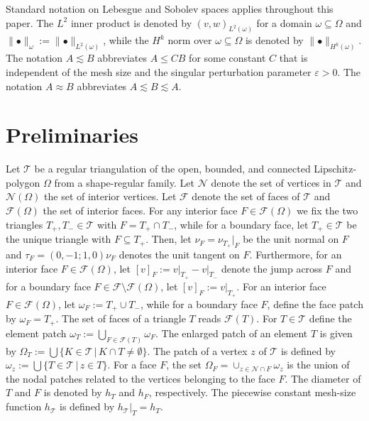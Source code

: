 \documentclass[a4paper]{amsart}
\theoremstyle{definition}
\numberwithin{equation}{section}
\numberwithin{theorem}{section}
\newcommand{\tri}{\mathcal{T}}
\begin{document}
\medskip
Standard notation on Lebesgue and Sobolev spaces
applies throughout this paper. The $L^2$ inner product is denoted
by
$(v,w)_{L^2(\omega)}$ for a domain $\omega\subseteq \Omega$
and $\lVert\bullet\rVert_\omega:=\lVert\bullet\rVert_{L^2(\omega)}$,
while the $H^k$ norm over $\omega\subseteq \Omega$
is denoted by
$\lVert\bullet\rVert_{H^k(\omega)}$.
The notation $A\lesssim B$ abbreviates $A\leq C B$ for some
constant $C$ that is independent of the mesh size and
the singular perturbation parameter $\varepsilon>0$.
The notation $A\approx B$ abbreviates $A\lesssim B\lesssim A$.




\section{Preliminaries}\label{s:prelim}

Let $\tri$ be a regular triangulation of the open, bounded, and connected
Lipschitz-polygon $\Omega$ from a shape-regular
family. 
Let $\mathcal{N}$ denote the set of vertices in $\tri$ and 
$\mathcal{N}(\Omega)$ the set of interior vertices.
Let $\mathcal{F}$ denote the set of faces of $\tri$ and
$\mathcal{F}(\Omega)$ the set of interior faces.
For any interior face $F\in\mathcal{F}(\Omega)$ we fix
the two triangles $T_+,T_-\in\tri$ with $F=T_+\cap T_-$,
while for a boundary face, let $T_+\in\tri$ be the unique
triangle with $F\subseteq T_+$.
Then, let $\nu_F=\nu_{T_+}\vert_F$ be the unit normal
on $F$ and $\tau_F = (0, -1; 1, 0) \nu_F$ denotes the unit tangent on $F$.
Furthermore, for an interior face $F\in\mathcal{F}(\Omega)$,
let $[v]_F:=v\vert_{T_+}-v\vert_{T_-}$ denote the jump across $F$
and for a boundary face $F\in\mathcal{F}\setminus\mathcal{F}(\Omega)$,
let $[v]_F:=v\vert_{T_+}$.
For an interior face $F\in\mathcal{F}(\Omega)$,
let $\omega_F:=T_+\cup T_-$, while for a boundary face $F$,
define the face patch by $\omega_F=T_+$.
The set of faces of a triangle $T$ reads $\mathcal F(T)$.
For $T\in\tri$ define the element patch 
$\omega_T:=\bigcup_{F\in\mathcal F(T)}\omega_F$.
The enlarged patch of an element $T$ is given by 
$\Omega_T:=\bigcup \{K\in\tri\,\vert\, K\cap T\neq \emptyset\}$.
The patch of a vertex $z$ of $\tri$ is defined by 
$\omega_z:=\bigcup \{T\in\tri\,\vert\, z\in T\}$.
For a face $F$, the set
$\Omega_F = \cup_{z\in \mathcal N \cap F} \omega_{z}$
is the union of the nodal patches related to the vertices
belonging to the face $F$.
The diameter of $T$ and $F$ is denoted by $h_T$ and $h_F$,
respectively. The piecewise constant mesh-size function
$h_\tri$ is defined by $h_\tri|_T=h_T$.
\end{document}
